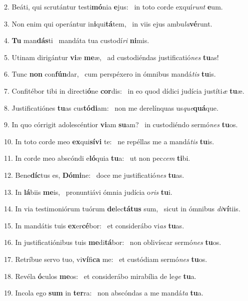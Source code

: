2. Beáti, qui scrutántur testi\textbf{mó}nia \textbf{e}jus: \ast\  in toto corde exquí\textit{runt} \textbf{e}um.\

3. Non enim qui operántur in\textbf{i}qui\textbf{tá}tem, \ast\  in viis ejus ambu\textit{la}\textbf{vé}runt.\

4. \textbf{Tu} man\textbf{dás}ti \ast\  mandáta tua custodí\textit{ri} \textbf{ni}mis.\

5. Utinam dirigántur \textbf{vi}æ \textbf{me}æ, \ast\  ad custodiéndas justificatió\textit{nes} \textbf{tu}as!\

6. Tunc \textbf{non} con\textbf{fún}dar, \ast\  cum perspéxero in ómnibus mandá\textit{tis} \textbf{tu}is.\

7. Confitébor tibi in directi\textbf{ó}ne \textbf{cor}dis: \ast\  in eo quod dídici judícia justíti\textit{æ} \textbf{tu}æ.\

8. Justificatiónes \textbf{tu}as cus\textbf{tó}\textbf{di}am: \ast\  non me derelínquas us\textit{que}\textbf{quá}que.\

9. In quo córrigit adolescéntior \textbf{vi}am \textbf{su}am? \ast\  in custodiéndo sermó\textit{nes} \textbf{tu}os.\

10. In toto corde meo \textbf{ex}qui\textbf{sí}\textbf{vi} te: \ast\  ne repéllas me a mandá\textit{tis} \textbf{tu}is.\

11. In corde meo abscóndi e\textbf{ló}quia \textbf{tu}a: \ast\  ut non pec\textit{cem} \textbf{ti}bi.\

12. Bene\textbf{díc}tus es, \textbf{Dó}\textbf{mi}ne: \ast\  doce me justificatió\textit{nes} \textbf{tu}as.\

13. In \textbf{lá}biis \textbf{me}is, \ast\  pronuntiávi ómnia judícia o\textit{ris} \textbf{tu}i.\

14. In via testimoniórum tuórum \textbf{de}lec\textbf{tá}\textbf{tus} sum, \ast\  sicut in ómnibus \textit{di}\textbf{ví}tiis.\

15. In mandátis tuis \textbf{ex}er\textbf{cé}bor: \ast\  et considerábo vi\textit{as} \textbf{tu}as.\

16. In justificatiónibus tuis \textbf{me}di\textbf{tá}bor: \ast\  non oblivíscar sermó\textit{nes} \textbf{tu}os.\

17. Retríbue servo tuo, vi\textbf{ví}fi\textbf{ca} me: \ast\  et custódiam sermó\textit{nes} \textbf{tu}os.\

18. Revéla \textbf{ó}culos \textbf{me}os: \ast\  et considerábo mirabília de le\textit{ge} \textbf{tu}a.\

19. Incola ego \textbf{sum} in \textbf{ter}ra: \ast\  non abscóndas a me mandá\textit{ta} \textbf{tu}a.\

